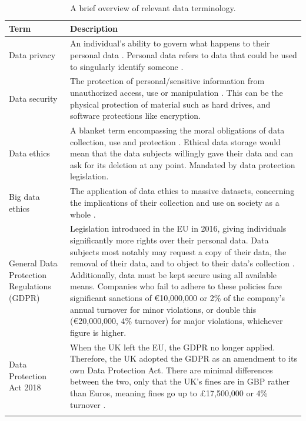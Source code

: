 \documentclass[12pt]{report}
\begin{document}
\begin{longtable}{ | p{} | p{} |}
    \hline
    \cellcolor{blue!25}Term & \cellcolor{blue!25}Description\\
    \hline
    Data privacy & An individual's ability to govern what happens to their personal data \autocite{cloudflare_what_nodate}. Personal data 
    refers to data that could be used to singularly identify someone \autocite{yang_big_2021}.\\
    \hline
    Data security & The protection of personal/sensitive information from unauthorized access, use or manipulation \autocite{ibm_security_2021}.
    This can be the physical protection of material such as hard drives, and software protections like encryption. \\
    \hline
    Data ethics & A blanket term encompassing the moral obligations of data collection, use and protection \autocite{harvard_business_school_5_2021}.
    Ethical data storage would mean that the data subjects willingly gave their data and can ask for its deletion at any point. 
    Mandated by data protection legislation. \\
    \hline 
    Big data ethics & The application of data ethics to massive datasets, concerning the implications of their collection and use on society as a whole
    \autocite{richards_big_2014}. \\
    \hline 
    General Data \newline Protection \newline Regulations (GDPR) & Legislation introduced in the EU in 2016, giving individuals significantly more 
    rights over their personal data. Data subjects most notably may request a copy of their data, the removal of their data, and to object to their data's 
    collection \autocite{ico_guide_2024}. Additionally, data must be kept secure using all available means. Companies who fail to adhere to these policies
    face significant sanctions of \euro10,000,000 or 2\% of the company's annual turnover for minor violations, or double this (\euro20,000,000, 4\% turnover)
    for major violations, whichever figure is higher. \\
    \hline
    Data Protection Act 2018 & When the UK left the EU, the GDPR no longer applied. Therefore, the UK adopted the GDPR as an amendment to its own
    Data Protection Act. There are minimal differences between the two, only that the UK's fines are in GBP rather than Euros, meaning fines go up 
    to \pounds17,500,000 or 4\% turnover \autocite{ico_enforcement_2024}. \\
    \hline
\caption{A brief overview of relevant data terminology.}\label{tab:dataTerms}
\end{longtable}
\end{document}
